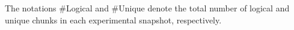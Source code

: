 \begin{table}[!t]
\raggedright
    The notations \#Logical and \#Unique denote the total number of logical and unique chunks in each experimental snapshot, respectively. 
\end{table}






